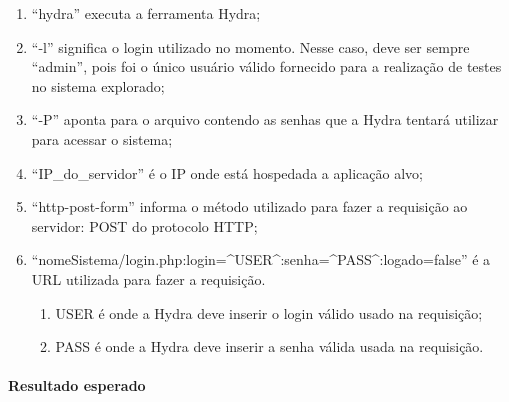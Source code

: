 \documentclass[
    12pt,               %
    openright,          %
    oneside,            %
    a4paper,            %
    section=TITLE,     %
    english,            %
    french,             %
    spanish,            %
    brazil              %
    ]{abntex2}
\begin{document}
\begin{enumerate}[start=1]
	
\item 
	\textquotedblleft{}hydra\textquotedblright{} executa a ferramenta Hydra;

	
	
\item 
	\textquotedblleft{}-l\textquotedblright{} significa o login utilizado no momento. Nesse caso, deve ser sempre \textquotedblleft{}admin\textquotedblright{}, pois foi o único usuário válido fornecido para a realização de testes no sistema explorado;

	
	
\item 
	\textquotedblleft{}-P\textquotedblright{} aponta para o arquivo contendo as senhas que a Hydra tentará utilizar para acessar o sistema;

	
	
\item 
	\textquotedblleft{}IP\_do\_servidor\textquotedblright{} é o IP onde está hospedada a aplicação alvo;

	
	
\item 
	\textquotedblleft{}http-post-form\textquotedblright{} informa o método utilizado para fazer a requisição ao servidor: POST do protocolo HTTP;

	
	
\item 
	\textquotedblleft{}nomeSistema/login.php:login=\^{}USER\^{}:senha=\^{}PASS\^{}:logado=false\textquotedblright{} é a URL utilizada para fazer a requisição.


	
\begin{enumerate}[start=1]
		
\item 
		USER é onde a Hydra deve inserir o login válido usado na requisição;

		
		
\item 
		PASS é onde a Hydra deve inserir a senha válida usada na requisição.

		
	
\end{enumerate}
	

\end{enumerate}


\paragraph*{Resultado esperado}
\end{document}
